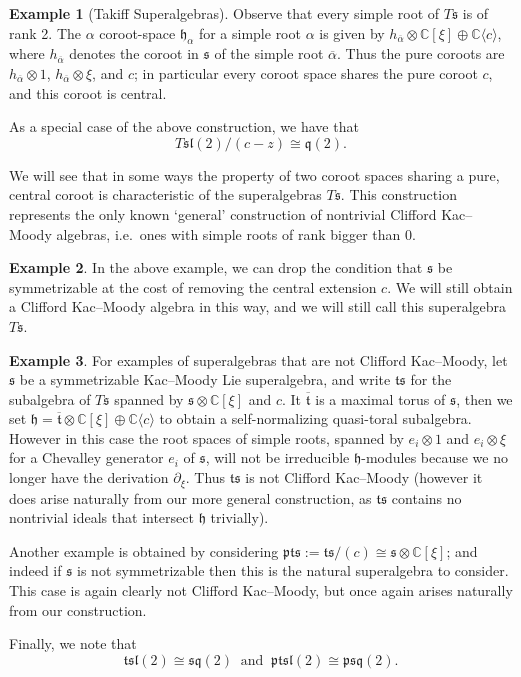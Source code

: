 \documentclass[12pt, a4paper, reqno]{amsart}
\def\C{\mathbb{C}}
\def\p{\mathfrak{p}}
\def\q{\mathfrak{q}}
\def\h{\mathfrak{h}}
\def\l{\mathfrak{l}}
\def\s{\mathfrak{s}}
\def\ol{\overline}
\def\d{\partial}
\theoremstyle{definition}
\theoremstyle{definition}
\theoremstyle{definition}
\newtheorem{example}{Example}}
\numberwithin{theorem}{section}
\numberwithin{lemma}{section}
\numberwithin{remark}{section}
\numberwithin{definition}{section}
\numberwithin{corollary}{section}
\numberwithin{proposition}{section}
\numberwithin{example}{section}
\begin{document}
\begin{example}[Takiff Superalgebras]
		Observe that every simple root of $T\s$ is of rank 2.  The $\alpha$ coroot-space $\h_{\alpha}$ for a simple root $\alpha$ is given by $h_{\ol{\alpha}}\otimes \C[\xi]\oplus\C\langle c\rangle$, where $h_{\ol{\alpha}}$ denotes the coroot in $\s$ of the simple root $\ol{\alpha}$.  Thus the pure coroots are $h_{\ol{\alpha}}\otimes 1$, $h_{\ol{\alpha}}\otimes\xi$, and $c$; in particular every coroot space shares the pure coroot $c$, and this coroot is central.
		
		As a special case of the above construction, we have that 
		\[
		T\s\l(2)/(c-z)\cong\q(2).
		\]
		
		We will see that in some ways the property of two coroot spaces sharing a pure, central coroot is characteristic of the superalgebras $T\s$.  This construction represents the only known `general' construction of nontrivial Clifford Kac--Moody algebras, i.e.~ones with simple roots of rank bigger than 0.      
	\end{example}
	
	\begin{example}\label{example_takiff_non_symm}
		In the above example, we can drop the condition that $\mathfrak{s}$ be symmetrizable at the cost of removing the central extension $c$.  We will still obtain a Clifford Kac--Moody algebra in this way, and we will still call this superalgebra $T\s$.
	\end{example}
	
	\begin{example}\label{example_ts_pts}
		For examples of superalgebras that are not Clifford Kac--Moody, let $\s$ be a symmetrizable Kac--Moody Lie superalgebra, and write $\mathfrak{t}\s$ for the subalgebra of $T\s$ spanned by $\s\otimes\C[\xi]$ and $c$.  It $\ol{\mathfrak{t}}$ is a maximal torus of $\s$, then we set $\h=\ol{\mathfrak{t}}\otimes\C[\xi]\oplus\C\langle c\rangle$ to obtain a self-normalizing quasi-toral subalgebra.  However in this case the root spaces of simple roots, spanned by $e_i\otimes 1$ and $e_i\otimes\xi$ for a Chevalley generator $e_i$ of $\s$, will not be irreducible $\h$-modules because we no longer have the derivation $\d_{\xi}$.  Thus $\mathfrak{t}\s$ is not Clifford Kac--Moody (however it does arise naturally from our more general construction, as $\mathfrak{t}\s$ contains no nontrivial ideals that intersect $\h$ trivially).  
		
		Another example is obtained by considering $\p\mathfrak{t}\s:=\mathfrak{t}\s/(c)\cong\s\otimes\C[\xi]$; and indeed if $\mathfrak{s}$ is not symmetrizable then this is the natural superalgebra to consider.  This case is again clearly not Clifford Kac--Moody, but once again arises naturally from our construction.
		
		Finally, we note that 
		\[
		\mathfrak{t}\s\l(2)\cong\s\q(2) \ \text{ and } \ \mathfrak{pt}\s\l(2)\cong\p\s\q(2).
		\]
	\end{example}
	
\end{document}
